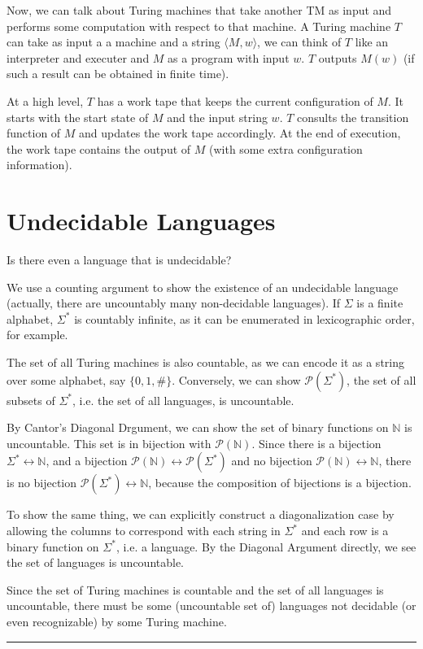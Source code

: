 \documentclass[twoside]{article}
\newenvironment{proof}{{\bf Proof:}}{\hfill\rule{2mm}{2mm}}
\begin{document}

Now, we can talk about Turing machines that take another TM as input and performs some computation with respect to that machine.  A Turing machine $T$ can take as input a a machine and a string $\langle M,w\rangle$, we can think of $T$ like an interpreter and executer and $M$ as a program with input $w$.  $T$ outputs $M(w)$ (if such a result can be obtained in finite time).

  At a high level, $T$ has a work tape that keeps the current configuration of $M$.  It starts with the start state of $M$ and the input string $w$.  $T$ consults the transition function of $M$ and updates the work tape accordingly.  At the end of execution, the work tape contains the output of $M$ (with some extra configuration information).


\section*{Undecidable Languages}

Is there even a language that is undecidable?


\begin{proof}
	
	We use a counting argument to show the existence of an undecidable language (actually, there are uncountably many non-decidable languages).  If $\Sigma$ is a finite alphabet, $\Sigma^*$ is countably infinite, as it can be enumerated in lexicographic order, for example.  
	
	The set of all Turing machines is also countable, as we can encode it as a string over some alphabet, say $\{0,1,\#\}$.  Conversely, we can show $\mathcal{P}(\Sigma^*)$, the set of all subsets of $\Sigma^*$, i.e. the set of all languages, is uncountable.  
	
	By Cantor's Diagonal Drgument, we can show the set of binary functions on $\mathbb{N}$ is uncountable.  This set is in bijection with $\mathcal{P}(\mathbb{N})$.  Since there is a bijection  $\Sigma^* \longleftrightarrow \mathbb{N}$, and a bijection $\mathcal{P}(\mathbb{N}) \longleftrightarrow \mathcal{P}(\Sigma^*)$ and no  bijection  $\mathcal{P}(\mathbb{N})\longleftrightarrow \mathbb{N}$, there is no bijection $\mathcal{P}(\Sigma^*) \longleftrightarrow \mathbb{N}$, because the composition of bijections is a bijection.
	
	To show the same thing, we can explicitly construct a diagonalization case by allowing the columns to correspond with each string in $\Sigma^*$ and each row is a binary function on $\Sigma^*$, i.e. a language.  By the Diagonal Argument directly, we see the set of languages is uncountable.
	
	Since the set of Turing machines is countable and the set of all languages is uncountable, there must be some (uncountable set of) languages not decidable (or even recognizable) by some Turing machine.
	
	
\end{proof}
\end{document}
